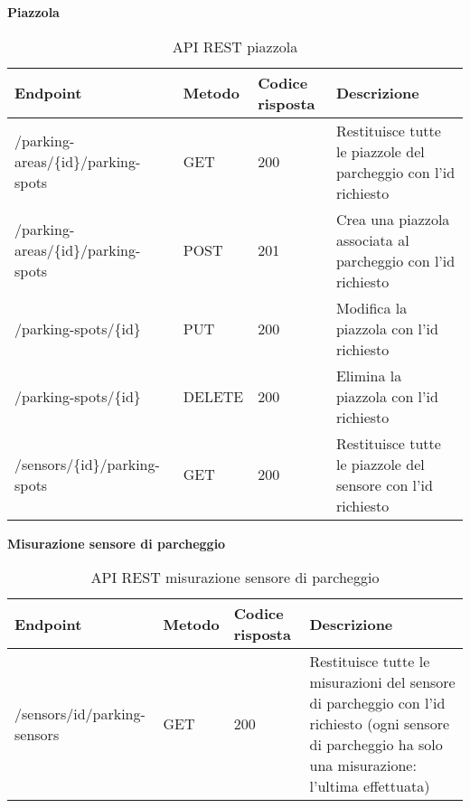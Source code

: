 \clearpage
\leavevmode\newline
\textbf{Piazzola}
\\
\begin{table}[H]
    \begin{tabular}{|p{3.2cm}|p{1.4cm}|p{1.4cm}|p{5.8cm}|} 
    \hline
    \textbf{Endpoint} & \textbf{Metodo} & \textbf{Codice risposta} & \textbf{Descrizione} \\ 
    \hline
    /parking-areas/\{id\}/parking-spots & GET & 200 & Restituisce tutte le piazzole del parcheggio con l'id 
    richiesto \\ 
    \hline
    /parking-areas/\{id\}/parking-spots & POST & 201 & Crea una piazzola associata al parcheggio con l'id 
    richiesto \\ 
    \hline
    /parking-spots/\{id\} & PUT & 200 & Modifica la piazzola con l'id richiesto \\ 
    \hline
    /parking-spots/\{id\} & DELETE & 200 & Elimina la piazzola con l'id richiesto \\ 
    \hline
    /sensors/\{id\}/parking-spots & GET & 200 & Restituisce tutte le piazzole del sensore con l'id 
    richiesto \\ 
    \hline
    \end{tabular}
    \caption{API REST piazzola}
\end{table}

\leavevmode\newline
\textbf{Misurazione sensore di parcheggio}
\\
\begin{table}[H]
    \begin{tabular}{|p{3.2cm}|p{1.4cm}|p{1.4cm}|p{5.8cm}|} 
    \hline
    \textbf{Endpoint} & \textbf{Metodo} & \textbf{Codice risposta} & \textbf{Descrizione} \\ 
    \hline
    /sensors/{id}/parking-sensors & GET & 200 & Restituisce tutte le misurazioni del sensore di parcheggio con l'id 
    richiesto (ogni sensore di parcheggio ha solo una misurazione: l'ultima effettuata) \\ 
    \hline
    \end{tabular}
    \caption{API REST misurazione sensore di parcheggio}
\end{table}